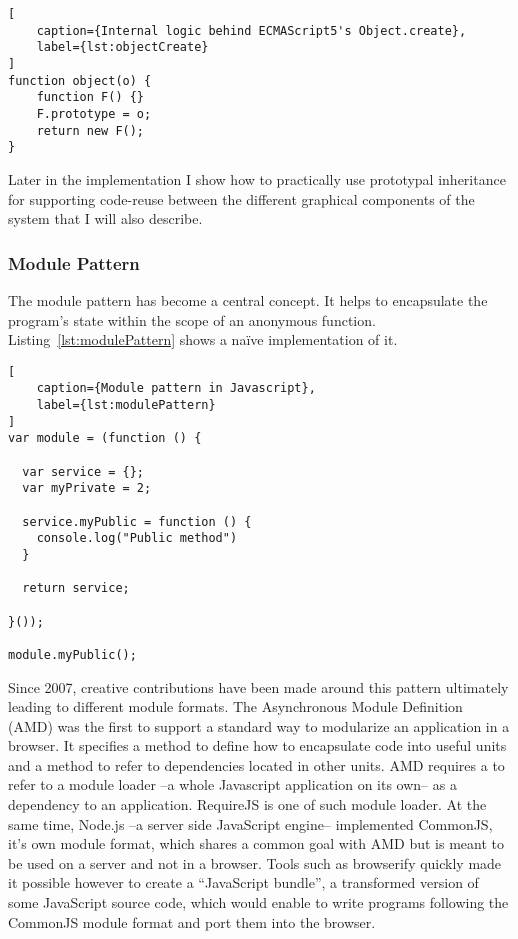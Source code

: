 \begin{lstlisting}[
    caption={Internal logic behind ECMAScript5's Object.create},
    label={lst:objectCreate}
]
function object(o) {
    function F() {}
    F.prototype = o;
    return new F();
}
\end{lstlisting}

Later in the implementation I show how to practically use prototypal inheritance for supporting code-reuse between the different graphical components of the system that I will also describe.

\subsubsection{Module Pattern}
\label{sec:modulePattern}

The module pattern\cite{Miraglia2007} has become a central concept. It helps to encapsulate the program's state within the scope of an anonymous function. Listing~\ref{lst:modulePattern} shows a naïve implementation of it.

\begin{lstlisting}[
    caption={Module pattern in Javascript},
    label={lst:modulePattern}
]
var module = (function () {

  var service = {};
  var myPrivate = 2;
  
  service.myPublic = function () {
    console.log("Public method")
  } 

  return service;

}());

module.myPublic();
\end{lstlisting}

Since 2007, creative contributions have been made around this pattern ultimately leading to different module formats. The Asynchronous Module Definition (AMD) was the first to support a standard way to modularize an application in a browser. It specifies a method to define how to encapsulate code into useful units and a method to refer to dependencies located in other units. AMD requires a to refer to a module loader --a whole Javascript application on its own-- as a dependency to an application. RequireJS is one of such module loader. At the same time, Node.js --a server side JavaScript engine-- implemented CommonJS, it's own module format, which shares a common goal with AMD but is meant to be used on a server and not in a browser. Tools such as browserify quickly made it possible however to create a ``JavaScript bundle'', a transformed version of some JavaScript source code, which would enable to write programs following the CommonJS module format and port them into the browser. 

